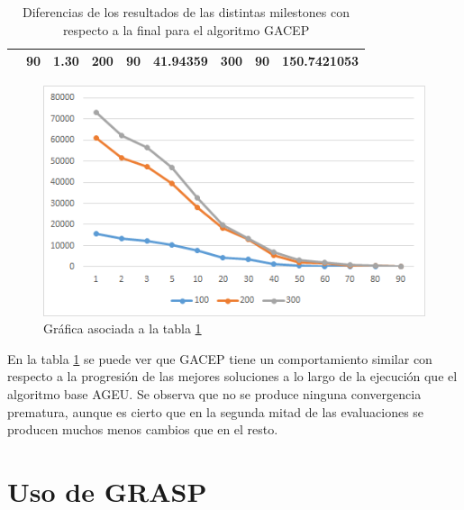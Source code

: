 \begin{table}[h]
\begin{tabular}{|cclcclccl|}
\rowcolor[HTML]{DAE8FC} 
\multicolumn{1}{|c|}{\multirow{-13}{*}{\cellcolor[HTML]{FFFFC7}\textbf{100}}} & \multicolumn{1}{c|}{\cellcolor[HTML]{DAE8FC}90}        & \multicolumn{1}{l|}{\cellcolor[HTML]{DAE8FC}1.30}       & \multicolumn{1}{c|}{\multirow{-13}{*}{\cellcolor[HTML]{FFFFC7}\textbf{200}}} & \multicolumn{1}{c|}{\cellcolor[HTML]{DAE8FC}90}        & \multicolumn{1}{l|}{\cellcolor[HTML]{DAE8FC}41.94359}   & \multicolumn{1}{c|}{\multirow{-13}{*}{\cellcolor[HTML]{FFFFC7}\textbf{300}}} & \multicolumn{1}{c|}{\cellcolor[HTML]{DAE8FC}90}        & 150.7421053 \\ \hline
\end{tabular}
\caption{\label{DiferenciasGACEP}Diferencias de los resultados de las distintas milestones con respecto a la final para el algoritmo GACEP}
\end{table}

\begin{figure}[h]
		\centering
		\includegraphics[scale=1]{imagenes/Experimental/DiferenciasGACEP.png}
        \caption{Gráfica asociada a la tabla \ref{DiferenciasGACEP}}
        \label{fig:DiferenciasGACEP}
\end{figure}

En la tabla \ref{DiferenciasGACEP} se puede ver que GACEP tiene un comportamiento similar con respecto a la progresión de las mejores soluciones a lo largo de la ejecución que el algoritmo base AGEU. 
Se observa que no se produce ninguna convergencia prematura, aunque es cierto que en la segunda mitad de las evaluaciones se producen muchos menos cambios que en el resto. 



\section{Uso de GRASP}

